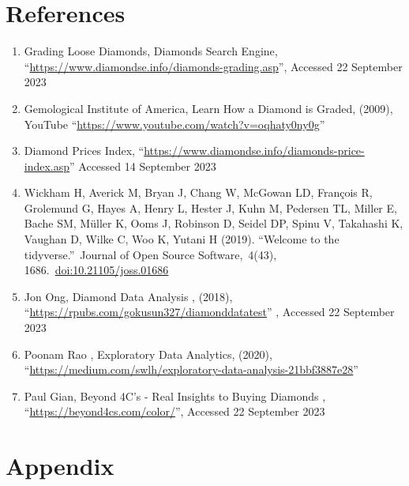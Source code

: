 \documentclass[
]{article}
\begin{document}
\section{References}\label{references}

\begin{enumerate}
\def\labelenumi{\arabic{enumi})}
\item
  Grading Loose Diamonds, Diamonds Search Engine,
  ``\url{https://www.diamondse.info/diamonds-grading.asp}'', Accessed 22
  September 2023
\item
  Gemological Institute of America, Learn How a Diamond is Graded,
  (2009), YouTube ``\url{https://www.youtube.com/watch?v=oqhaty0ny0g}''
\item
  Diamond Prices Index,
  ``\url{https://www.diamondse.info/diamonds-price-index.asp}'' Accessed
  14 September 2023
\item
  Wickham H, Averick M, Bryan J, Chang W, McGowan LD, François R,
  Grolemund G, Hayes A, Henry L, Hester J, Kuhn M, Pedersen TL, Miller
  E, Bache SM, Müller K, Ooms J, Robinson D, Seidel DP, Spinu V,
  Takahashi K, Vaughan D, Wilke C, Woo K, Yutani H (2019). ``Welcome to
  the tidyverse.''~Journal of Open Source Software,~4(43),
  1686.~\url{doi:10.21105/joss.01686}
\item
  Jon Ong, Diamond Data Analysis , (2018),
  ``\url{https://rpubs.com/gokusun327/diamonddatatest}'' , Accessed 22
  September 2023
\item
  Poonam Rao , Exploratory Data Analytics, (2020),
  ``\url{https://medium.com/swlh/exploratory-data-analysis-21bbf3887e28}''
\item
  Paul Gian, Beyond 4C's - Real Insights to Buying Diamonds ,
  ``\url{https://beyond4cs.com/color/}'', Accessed 22 September 2023
\end{enumerate}

\newpage

\section{Appendix}\label{appendix}
\end{document}

